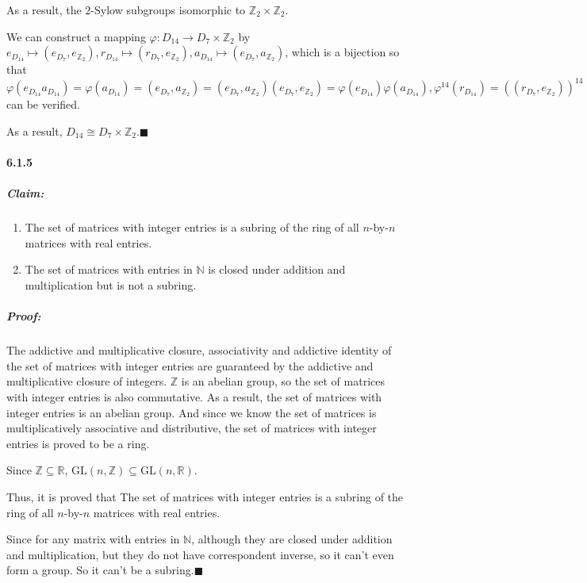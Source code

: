 \documentclass[11pt]{article}
\begin{document}
			As a result, the $2$-Sylow subgroups isomorphic to $\mathbb{Z}_2 \times \mathbb{Z}_2$.
			
			We can construct a mapping $\varphi: D_{14} \rightarrow D_7 \times \mathbb{Z}_2$ by $e_{D_{14}} \mapsto (e_{D_7}, e_{\mathbb{Z}_2}), r_{D_{14}} \mapsto (r_{D_7}, e_{\mathbb{Z}_2}), a_{D_{14}} \mapsto (e_{D_7}, a_{\mathbb{Z}_2})$, which is a bijection so that $\varphi({e_{D_{14}}a_{D_{14}}}) = \varphi(a_{D_{14}}) = (e_{D_7}, a_{\mathbb{Z}_2}) = (e_{D_7}, a_{\mathbb{Z}_2})(e_{D_7}, e_{\mathbb{Z}_2}) = \varphi(e_{D_{14}})\varphi(a_{D_{14}}), \varphi^{14}(r_{D_{14}}) = ((r_{D_7}, e_{\mathbb{Z}_2}))^{14} = (r_{D_7}^{14}, e_{\mathbb{Z}_2}^{14}) = (e_{D_7}, e_{\mathbb{Z}_2}) = \varphi(r_{D_{14}}^{14}), \varphi^2(a_{D_{14}}) = (e_{D_7}, a_{\mathbb{Z}_2})^2 = (e_{D_7}^2, a_{\mathbb{Z}_2}^2) = (e_{D_7}, e_{\mathbb{Z}_2}) = \varphi(a_{D_{14}}^2)$ can be verified.
			
			As a result, $D_{14} \cong D_7 \times \mathbb{Z}_2$.$\blacksquare$			
	\paragraph{6.1.5}
		\subparagraph{Claim:}
			\begin{enumerate}
				\item The set of matrices with integer entries is a subring of the ring of all $n$-by-$n$ matrices with real entries.
				\item The set of matrices with entries in $\mathbb{N}$ is closed under addition and multiplication but is not a subring. 
			\end{enumerate}
		\subparagraph{Proof:} The addictive and multiplicative closure, associativity and addictive identity of the set of matrices with integer entries are guaranteed by the addictive and multiplicative closure of integers. $\mathbb{Z}$ is an abelian group, so the set of matrices with integer entries is also commutative. As a result, the set of matrices with integer entries is an abelian group. And since we know the set of matrices is multiplicatively associative and distributive, the set of matrices with integer entries is proved to be a ring.
		
		Since $\mathbb{Z} \subseteq \mathbb{R}$, $\mathrm{GL}(n, \mathbb{Z}) \subseteq \mathrm{GL}(n, \mathbb{R})$.
		
		Thus, it is proved that The set of matrices with integer entries is a subring of the ring of all $n$-by-$n$ matrices with real entries.
		
		Since for any matrix with entries in $\mathbb{N}$, although they are closed under addition and multiplication, but they do not have correspondent inverse, so it can't even form a group. So it can't be a subring.$\blacksquare$
\end{document}
